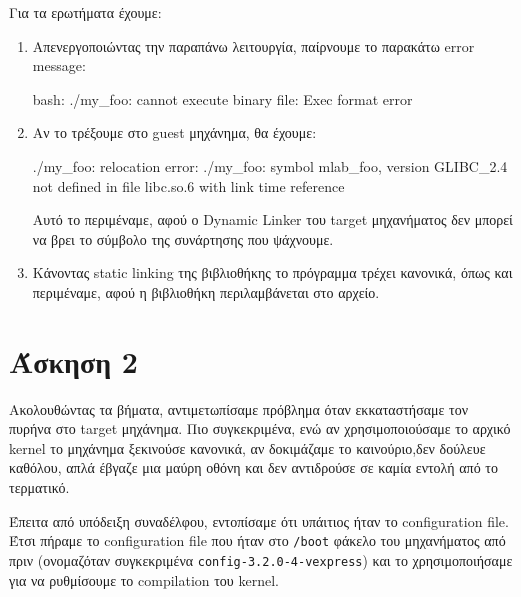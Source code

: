 \documentclass{article}
\newcommand{\english}[1]{\foreignlanguage{english}{{#1}}}
\begin{document}
Για τα ερωτήματα έχουμε:
\begin{enumerate}
  \item Απενεργοποιώντας την παραπάνω λειτουργία, παίρνουμε το παρακάτω \english{error message}:
  \begin{otherlanguage}{english}
    \begin{tcolorbox}[width=\linewidth, colback={backcolour}, colupper=black]
      bash: ./my\_foo: cannot execute binary file: Exec format error
    \end{tcolorbox}
  \end{otherlanguage}
  \item Αν το τρέξουμε στο \english{guest} μηχάνημα, θα έχουμε:
  \begin{otherlanguage}{english}
    \begin{tcolorbox}[width=\linewidth, colback={backcolour}, colupper=black]
      ./my\_foo: relocation error: ./my\_foo: symbol mlab\_foo, version GLIBC\_2.4 not defined in file libc.so.6 with link time reference
    \end{tcolorbox}
  \end{otherlanguage}
  Αυτό το περιμέναμε, αφού ο \english{Dynamic Linker} του \english{target} μηχανήματος δεν μπορεί να βρει το σύμβολο της συνάρτησης που ψάχνουμε.
  \item Κάνοντας \english{static linking} της βιβλιοθήκης το πρόγραμμα τρέχει κανονικά, όπως και περιμέναμε, αφού η βιβλιοθήκη περιλαμβάνεται στο αρχείο.
\end{enumerate}

\section*{Άσκηση 2}

Ακολουθώντας τα βήματα, αντιμετωπίσαμε πρόβλημα όταν εκκαταστήσαμε τον πυρήνα στο \english{target} μηχάνημα. Πιο συγκεκριμένα, ενώ αν χρησιμοποιούσαμε το αρχικό \english{kernel} το μηχάνημα ξεκινούσε κανονικά, αν δοκιμάζαμε το καινούριο,δεν δούλευε καθόλου, απλά έβγαζε μια μαύρη οθόνη και δεν αντιδρούσε σε καμία εντολή από το τερματικό. 

Έπειτα από υπόδειξη συναδέλφου, εντοπίσαμε ότι υπάιτιος ήταν το \english{configuration file}. Έτσι πήραμε το \english{configuration file} που ήταν στο \english{\texttt{/boot}} φάκελο του μηχανήματος από πριν (ονομαζόταν συγκεκριμένα \english{\texttt{config-3.2.0-4-vexpress}}) και το χρησιμοποιήσαμε για να ρυθμίσουμε το \english{compilation} του \english{kernel}.
\end{document}
